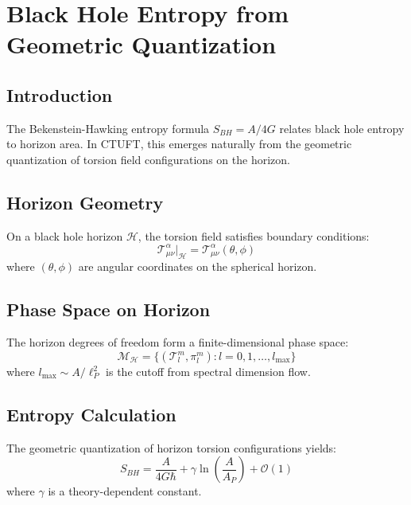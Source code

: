 \section{Black Hole Entropy from Geometric Quantization}
\label{sec:bh_entropy}

\subsection{Introduction}

The Bekenstein-Hawking entropy formula $S_{BH} = A/4G$ relates black hole entropy to horizon area. In CTUFT, this emerges naturally from the geometric quantization of torsion field configurations on the horizon.

\subsection{Horizon Geometry}

\begin{definition}
On a black hole horizon $\mathcal{H}$, the torsion field satisfies boundary conditions:
\begin{equation}
    \mathcal{T}^\alpha_{\mu\nu}|_{\mathcal{H}} = \mathcal{T}^\alpha_{\mu\nu}(\theta, \phi)
\end{equation}
where $(\theta, \phi)$ are angular coordinates on the spherical horizon.
\end{definition}

\subsection{Phase Space on Horizon}

The horizon degrees of freedom form a finite-dimensional phase space:
\begin{equation}
    \mathcal{M}_{\mathcal{H}} = \{ (\mathcal{T}_l^m, \pi_l^m) : l = 0, 1, \ldots, l_{\max} \}
\end{equation}
where $l_{\max} \sim A/\ell_P^2$ is the cutoff from spectral dimension flow.

\subsection{Entropy Calculation}

\begin{theorem}
The geometric quantization of horizon torsion configurations yields:
\begin{equation}
    S_{BH} = \frac{A}{4G\hbar} + \gamma \ln\left(\frac{A}{A_P}\right) + \mathcal{O}(1)
\end{equation}
where $\gamma$ is a theory-dependent constant.
\end{theorem}

